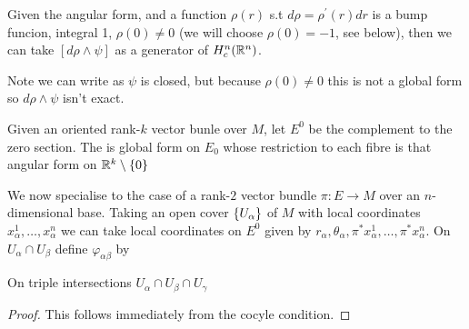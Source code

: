 \documentclass{article}
\begin{document}
Given the angular form, and a function $\rho(r)$ s.t $d\rho = \rho^\prime(r) dr$ is a bump funcion, integral 1, $\rho(0)\neq0$ (we will choose $\rho(0)=-1$, see below), then we can take $[d\rho \wedge \psi]$ as a generator of $H_c^n(\mathbb{R}^n)$. 

\begin{center}
\end{center}

\begin{remark}
	Note we can write 
	as $\psi$ is closed, but because $\rho(0)\neq 0$ this is not a global form so $d\rho \wedge \psi$ isn't exact. 
\end{remark}

\begin{definition}
	Given an oriented rank-$k$ vector bunle over $M$, let $E^0$ be the complement to the zero section. The  is global form on $E_0$ whose restriction to each fibre is that angular form on $\mathbb{R}^k \setminus \left\{ 0 \right\}$
\end{definition}

We now specialise to the case of a rank-$2$ vector bundle $\pi : E \to M$ over an $n$-dimensional base. Taking an open cover $\left\{ U_\alpha \right\}$ of $M$ with local coordinates $x_\alpha^1, \dots, x_\alpha^n$ we can take local coordinates on $E^0$ given by $r_\alpha,\theta_\alpha,\pi^\ast x_\alpha^1, \dots, \pi^\ast x^n_\alpha$. On $U_\alpha \cap U_\beta$ define $\varphi_{\alpha\beta}$ by 
\eq{
\theta_\beta = \theta_\alpha + \pi^\ast \varphi_{\alpha\beta}
}
\begin{lemma}
	On triple intersections $U_\alpha \cap U_\beta \cap U_\gamma$ 
\end{lemma}
\begin{proof}
	This follows immediately from the cocyle condition. 
\end{proof}
\end{document}
